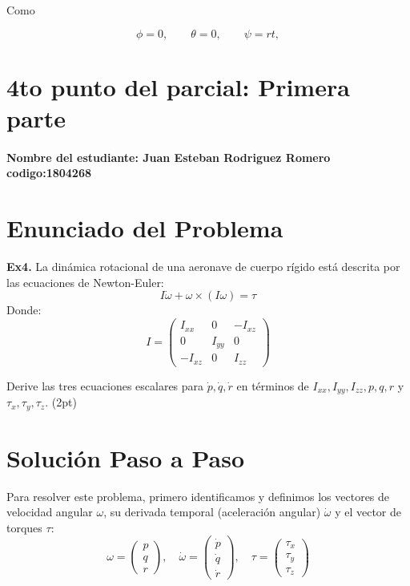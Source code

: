 \documentclass[11pt,a4paper]{article}
\begin{document}
Como

\begin{equation}
\phi=0,
\qquad
\theta=0,
\qquad
\psi=rt,
\end{equation}

\section{4to punto del parcial: Primera parte}

\paragraph{Nombre del estudiante: Juan Esteban Rodriguez Romero codigo:1804268 }

\vspace{0.5cm}

\section*{Enunciado del Problema}

\textbf{Ex4.} La dinámica rotacional de una aeronave de cuerpo rígido está descrita por las ecuaciones de Newton-Euler:
\begin{equation*}
    I\dot{\omega} + \omega \times (I\omega) = \tau
\end{equation*}
Donde:
\begin{equation*}
    I = \begin{pmatrix}
    I_{xx} & 0 & -I_{xz} \\
    0 & I_{yy} & 0 \\
    -I_{xz} & 0 & I_{zz}
    \end{pmatrix}
\end{equation*}

Derive las tres ecuaciones escalares para $\dot{p}, \dot{q}, \dot{r}$ en términos de $I_{xx}, I_{yy}, I_{zz}, p, q, r$ y $\tau_x, \tau_y, \tau_z$. (2pt)

\vspace{0.5cm}

\section*{Solución Paso a Paso}

Para resolver este problema, primero identificamos y definimos los vectores de velocidad angular $\omega$, su derivada temporal (aceleración angular) $\dot{\omega}$ y el vector de torques $\tau$:
\begin{equation*}
    \omega = \begin{pmatrix} p \\ q \\ r \end{pmatrix}, \quad
    \dot{\omega} = \begin{pmatrix} \dot{p} \\ \dot{q} \\ \dot{r} \end{pmatrix}, \quad
    \tau = \begin{pmatrix} \tau_x \\ \tau_y \\ \tau_z \end{pmatrix}
\end{equation*}
\end{document}
